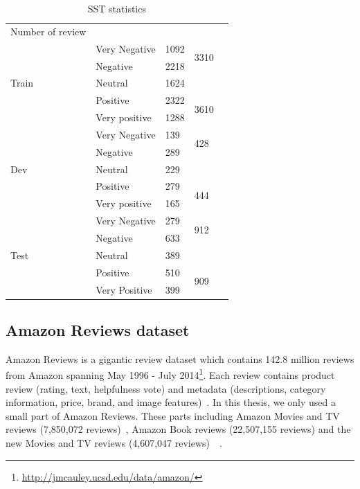 \begin{table}[H]
    \centering
    \caption{SST statistics}
    \label{table:sststatistic}
    \begin{tabular}{lllll}
        Number of review       &               &      &                       &  \\ \cline{1-4}
        \multirow{5}{*}{Train} & Very Negative & 1092 & \multirow{2}{*}{3310} &  \\ \cline{2-3}
        & Negative      & 2218 &                       &  \\ \cline{2-4}
        & Neutral       & 1624 &                       &  \\ \cline{2-4}
        & Positive      & 2322 & \multirow{2}{*}{3610} &  \\ \cline{2-3}
        & Very positive & 1288 &                       &  \\ \cline{1-4}
        \multirow{5}{*}{Dev}   & Very Negative & 139  & \multirow{2}{*}{428}  &  \\ \cline{2-3}
        & Negative      & 289  &                       &  \\ \cline{2-4}
        & Neutral       & 229  &                       &  \\ \cline{2-4}
        & Positive      & 279  & \multirow{2}{*}{444}  &  \\ \cline{2-3}
        & Very positive & 165  &                       &  \\ \cline{1-4}
        \multirow{5}{*}{Test}  & Very Negative & 279  & \multirow{2}{*}{912}  &  \\ \cline{2-3}
        & Negative      & 633  &                       &  \\ \cline{2-4}
        & Neutral       & 389  &                       &  \\ \cline{2-4}
        & Positive      & 510  & \multirow{2}{*}{909}  &  \\ \cline{2-3}
        & Very Positive & 399  &                       &  \\ \cline{2-4}
    \end{tabular}
\end{table}

\subsection{Amazon Reviews dataset}\label{sec:amazon}
Amazon Reviews is a gigantic review dataset
which contains 142.8 million reviews from Amazon spanning May 1996 - July 2014\footnote{\url{http://jmcauley.ucsd.edu/data/amazon/}}.
Each review contains product review (rating, text, helpfulness vote) and metadata (descriptions, category information, price, brand, and image features)~\cite{amazon-reviews}.
In this thesis, we only used a small part of Amazon Reviews.
These parts including Amazon Movies and TV reviews (7,850,072 reviews)~\cite{mcauley2013hidden}, Amazon Book reviews (22,507,155 reviews) and the new Movies and TV reviews (4,607,047 reviews)~\cite{McAuleyTSH15}~\cite{HeM16}. 

